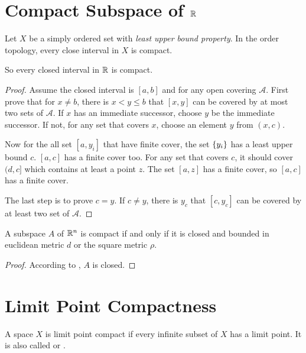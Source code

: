 
\section{Compact Subspace of $\mathbb{R}$}

\begin{theorem}
    Let $X$ be a simply ordered set with \emph{least upper bound property}. In the order topology, every close interval in $X$ is compact. 
    
    So every closed interval in $\mathbb{R}$ is compact.
\end{theorem}
\begin{proof}
    Assume the closed interval is $[a,b]$ and for any open covering $\mathcal{A}$. First prove that for $x \neq b$, there is $x < y \leq b$ that $[x,y]$ can be covered by at most two sets of $\mathcal{A}$. If $x$ has an immediate successor, choose $y$ be the immediate successor. If not, for any set that covers $x$, choose an element $y$ from $(x,c)$.
    
    Now for the all set $[a,y_i]$ that have finite cover, the set $\set{y_i}$ has a least upper bound $c$. $[a,c]$ has a finite cover too. For any set that covers $c$, it should cover $(d,c]$ which contains at least a point $z$. The set $[a,z]$ has a finite cover, so $[a,c]$ has a finite cover.
    
    The last step is to prove $c = y$. If $c \neq y$, there is $y_c$ that $[c, y_c]$ can be covered by at least two set of $\mathcal{A}$.
\end{proof}

\begin{theorem}
    A subspace $A$ of $\mathbb{R}^n$ is compact if and only if it is closed and bounded in euclidean metric $d$ or the square metric $\rho$.    
\end{theorem}
\begin{proof}
    According to , $A$ is closed.
\end{proof}




\section{Limit Point Compactness}

\begin{definition}
    A space $X$ is limit point compact if every infinite subset of $X$ has a limit point. It is also called  or .
\end{definition}

